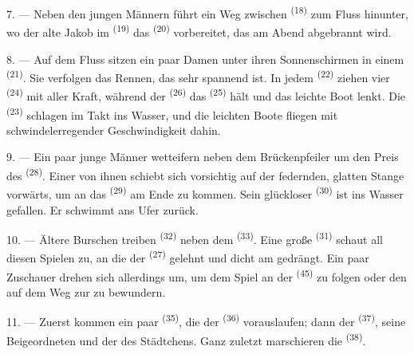 7. --- Neben den jungen Männern führt ein Weg zwischen 
\textsuperscript{(18)} zum Fluss hinunter, wo der alte Jakob im 
\textsuperscript{(19)} das  \textsuperscript{(20)} vorbereitet, das
am Abend abgebrannt wird.

\VUsaut{4.4mm}
\VUsaut{3.4mm}

8. --- Auf dem Fluss sitzen ein paar Damen unter ihren Sonnenschirmen in einem
 \textsuperscript{(21)}. Sie verfolgen das Rennen, das sehr
spannend ist. In jedem  \textsuperscript{(22)} ziehen vier
 \textsuperscript{(24)} mit aller Kraft, während der
 \textsuperscript{(26)} das 
\textsuperscript{(25)} hält und das leichte Boot lenkt. Die 
\textsuperscript{(23)} schlagen im Takt ins Wasser, und die leichten Boote fliegen
mit schwindelerregender Geschwindigkeit dahin.

9. --- Ein paar junge Männer wetteifern neben dem Brückenpfeiler um den Preis des
 \textsuperscript{(28)}. Einer von ihnen schiebt sich vorsichtig
auf der federnden, glatten Stange vorwärts, um an das 
\textsuperscript{(29)} am Ende zu kommen. Sein glückloser 
\textsuperscript{(30)} ist ins Wasser gefallen. Er schwimmt ans Ufer zurück.

10. --- Ältere Burschen treiben  \textsuperscript{(32)} neben
dem  \textsuperscript{(33)}. Eine große 
\textsuperscript{(31)} schaut all diesen Spielen zu, an die  der
 \textsuperscript{(27)} gelehnt und dicht am  gedrängt.
Ein paar Zuschauer drehen sich allerdings um, um dem Spiel an der
 \textsuperscript{(45)} zu folgen oder den
 auf dem Weg zur  zu
bewundern.

11. --- Zuerst kommen ein paar  \textsuperscript{(35)}, die der
 \textsuperscript{(36)} vorauslaufen; dann der
 \textsuperscript{(37)}, seine Beigeordneten und der
 des Städtchens. Ganz zuletzt marschieren die
 \textsuperscript{(38)}.

\VUsaut{5.0mm}
\VUsaut{3.6mm}


